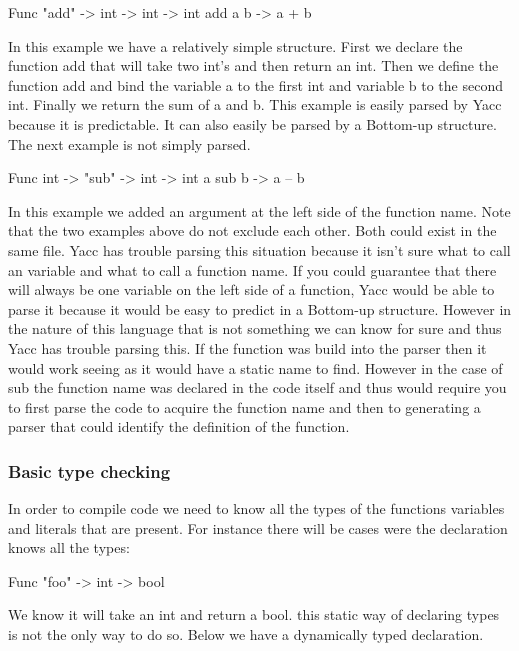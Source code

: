 \begin{code}
	Func "add" -> int -> int -> int 
	add a b -> a + b 
\end{code}

In this example we have a relatively simple structure. First we declare the function add that will take two int’s and then return an int. Then we define the function add and bind the variable a to the first int and variable b to the second int. Finally we return the sum of a and b. This example is easily parsed by Yacc because it is predictable. It can also easily be parsed by a Bottom-up structure. The next example is not simply parsed. 

\begin{code}
	Func int -> "sub" -> int -> int 
	a sub b -> a – b 
\end{code}

In this example we added an argument at the left side of the function name. Note that the two examples above do not exclude each other. Both could exist in the same file. Yacc has trouble parsing this situation because it isn’t sure what to call an variable and what to call a function name. If you could guarantee that there will always be one variable on the left side of a function, Yacc would be able to parse it because it would be easy to predict in a Bottom-up structure. However in the nature of this language that is not something we can know for sure and thus Yacc has trouble parsing this. If the function was build into the parser then it would work seeing as it would have a static name to find. However in the case of sub the function name was declared in the code itself and thus would require you to first parse the code to acquire the function name and then to generating a parser that could identify the definition of the function. 

\subsubsection{Basic type checking}

In order to compile code we need to know all the types of the functions variables and literals that are present. For instance there will be cases were the declaration knows all the types: 

\begin{code}
	Func "foo" -> int -> bool  
\end{code}

We know it will take an int and return a bool. this static way of declaring types is not the only way to do so. Below we have a dynamically typed declaration. 

